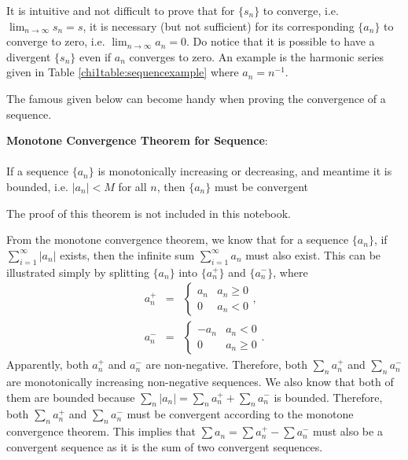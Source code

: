 It is intuitive and not difficult to prove that for $\{s_n\}$ to converge, i.e. $\lim_{n\rightarrow\infty}s_n = s$, it is necessary (but not sufficient) for its corresponding $\{a_n\}$ to converge to zero, i.e. $\lim_{n\rightarrow\infty}a_n = 0$. Do notice that it is possible to have a divergent $\{s_n\}$ even if $a_n$ converges to zero. An example is the harmonic series given in Table \ref{chi1table:sequencexample} where $a_n = n^{-1}$. 

The famous  given below can become handy when proving the convergence of a sequence.
\begin{mdframed}
\textbf{Monotone Convergence Theorem for Sequence}:
\\
\\
\noindent If a sequence $\{a_n\}$ is monotonically increasing or decreasing, and meantime it is bounded, i.e. $|a_n| < M$ for all $n$, then $\{a_n\}$ must be convergent
\end{mdframed}
The proof of this theorem is not included in this notebook.

From the monotone convergence theorem, we know that for a sequence $\{a_n\}$, if $\sum_{i=1}^{\infty}|a_n|$ exists, then the infinite sum $\sum_{i=1}^{\infty}a_n$ must also exist. This can be illustrated simply by splitting $\{a_n\}$ into $\{a_n^+\}$ and $\{a_n^-\}$, where
\begin{eqnarray}
  a_n^+ &=& \left\{\begin{array}{cc}
                     a_n & a_n \geq 0 \\
                     0 & a_n < 0
                   \end{array}\right.,  \nonumber \\
  a_n^- &=& \left\{\begin{array}{cc}
                     -a_n & a_n < 0 \\
                     0 & a_n \geq 0
                   \end{array}\right.. \nonumber
\end{eqnarray}
Apparently, both $a_n^+$ and $a_n^-$ are non-negative. Therefore, both $\sum_na_n^+$ and $\sum_na_n^-$ are monotonically increasing non-negative sequences. We also know that both of them are bounded because $\sum_{n}|a_n| = \sum_{n}a_n^+ + \sum_{n}a_n^-$ is bounded. Therefore, both $\sum_na_n^+$ and $\sum_na_n^-$ must be convergent according to the monotone convergence theorem. This implies that $\sum a_n = \sum a_n^+ - \sum a_n^-$ must also be a convergent sequence as it is the sum of two convergent sequences.

